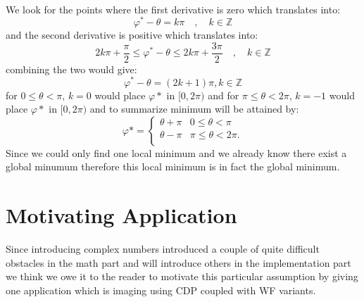 \begin{Proof}
\begin{equation}
\begin{split}
				\end{split}
			  \end{equation}
        We look for the points where the first derivative is zero which translates into:
        \begin{equation}
          \varphi^* - \theta = k\pi \quad , \quad k \in \mathbb{Z} 
        \end{equation}
        and the second derivative is positive which translates into:
        \begin{equation}
         2k\pi + \frac{\pi}{2} \leq \varphi^* - \theta \leq 2k\pi + \frac{3\pi}{2} \quad , \quad k \in \mathbb{Z}
        \end{equation}
        combining the two would give:
        \begin{equation}
          \varphi^* -\theta = (2k+1)\pi, k \in \mathbb{Z}
        \end{equation}
        for $0   \leq \theta <  \pi$, $k=0$ would place $\varphi*$ in $[0,2\pi)$ and for  $\pi \leq \theta < 2\pi$, 
        $k=-1$ would place $\varphi*$ in $[0,2\pi)$ and to summarize minimum will be attained by:
        \begin{equation}
          \varphi* =
          \begin{cases}
            \theta + \pi & 0   \leq \theta <  \pi\\
            \theta - \pi & \pi \leq \theta < 2\pi.\\
          \end{cases}
        \end{equation}
        Since we could only find one local minimum and we already know there exist a global minumum therefore this local minimum is in fact the global minimum.
		\end{Proof}


  




\section{Motivating Application}\label{sec:motivating_application}

Since introducing complex numbers introduced a couple of quite difficult obstacles in the math part and will introduce others in the implementation part 
we think we owe it to the reader to motivate this particular assumption by giving one application which is imaging using \ac{CDP} coupled with \ac{WF} variants.

